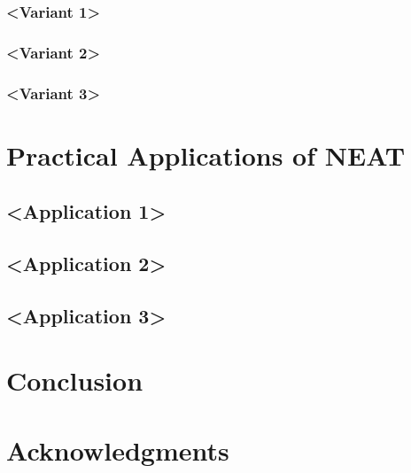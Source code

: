 \documentclass[journal, a4paper]{IEEEtran}
\begin{document}
\subsubsection{<Variant 1>}
\subsubsection{<Variant 2>}
\subsubsection{<Variant 3>}




\section{Practical Applications of NEAT}

\subsection{<Application 1>}
\subsection{<Application 2>}
\subsection{<Application 3>}





\section{Conclusion}

\blindtext




\section{Acknowledgments}
\end{document}
